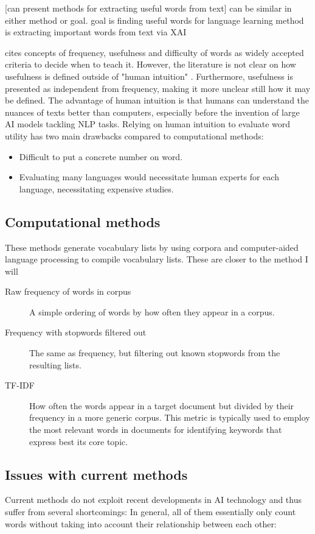 [can present methods for extracting useful words from text]
can be similar in either method or goal.
goal is finding useful words for language learning
method is extracting important words from text via XAI

\cite{heChoosingWordsTeach2019} cites concepts of frequency, usefulness and difficulty of words as widely accepted criteria to decide when to teach it.
However, the literature is not clear on how usefulness is defined outside of "human intuition" \cite{heChoosingWordsTeach2019}.
Furthermore, usefulness is presented as independent from frequency, making it more unclear still how it may be defined.
The advantage of human intuition is that humans can understand the nuances of texts better than computers, especially before the invention of large AI models tackling NLP tasks.
Relying on human intuition to evaluate word utility has two main drawbacks compared to computational methods:
\begin{itemize}
	\item Difficult to put a concrete number on word.
	\item Evaluating many languages would necessitate human experts for each language, necessitating expensive studies.
\end{itemize}

\subsection{Computational methods}
These methods generate vocabulary lists by using corpora and computer-aided language processing to compile vocabulary lists.
These are closer to the method I will

\begin{description}
	\item [Raw frequency of words in corpus]
	      A simple ordering of words by how often they appear in a corpus.
	\item [Frequency with stopwords filtered out]
	      The same as frequency, but filtering out known stopwords from the resulting lists.
	\item [TF-IDF]
	      How often the words appear in a target document but divided by their frequency in a more generic corpus.
	      This metric is typically used to employ the most relevant words in documents for identifying keywords that express best its core topic.
\end{description}

\subsection{Issues with current methods}
Current methods do not exploit recent developments in AI technology and thus suffer from several shortcomings:
In general, all of them essentially only count words without taking into account their relationship between each other:

